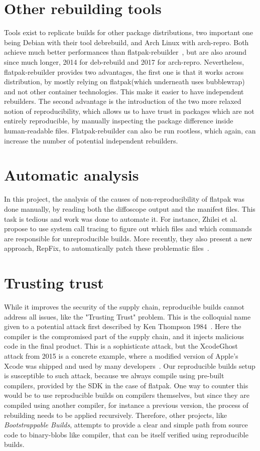 \documentclass[a4paper,11pt,oneside]{report}
\theoremstyle{definition}
\newcommand{\sysname}{flatpak-rebuilder\xspace}
\newcommand{\Sysname}{Flatpak-rebuilder\xspace}
\newcommand{\rb}{reproducible builds\xspace}
\newcommand{\fp}{flatpak\xspace}
\begin{document}
\section{Other rebuilding tools}
Tools exist to replicate builds for other package distributions, two important
one being Debian with their tool debrebuild, and Arch Linux with arch-repro.
Both achieve much better performances than \sysname~\cite{debian:repro,
arch-rebuilderd}, but are also around since much longer, 2014 for deb-rebuild
and 2017 for arch-repro. Nevertheless, \sysname provides two advantages, the
first one is that it works across distribution, by mostly relying on \fp (which
underneath uses bubblewrap) and not other container technologies. This make it
easier to have independent rebuilders. The second advantage is the introduction
of the two more relaxed notion of reproducibility, which allows us to have
trust in packages which are not entirely reproducible, by manually inspecting
the package difference inside human-readable files. \Sysname can also be run
rootless, which again, can increase the number of potential independent
rebuilders.

\section{Automatic analysis}
In this project, the analysis of the causes of non-reproducibility of \fp was
done manually, by reading both the diffoscope output and the manifest files.
This task is tedious and work was done to automate it. For instance, Zhilei et
al.~\cite{DBLP:journals/corr/abs-1803-06766} propose to use system call tracing
to figure out which files and which commands are responsible for unreproducible
builds. More recently, they also present a new approach, RepFix, to
automatically patch these problematic files~\cite{repfix}.

\section{Trusting trust}
While it improves the security of the supply chain, \rb cannot address all
issues, like the "Trusting Trust" problem. This is the colloquial name given to
a potential attack first described by Ken Thompson 1984~\cite{thompson1984}.
Here the compiler is the compromised part of the supply chain, and it injects
malicious code in the final product. This is a sophisticate attack, but the
XcodeGhost attack from 2015 is a concrete example, where a modified version of
Apple's Xcode was shipped and used by many developers~\cite{enwiki:1054394297}.
Our \rb setup is susceptible to such attack, because we always compile using
pre-built compilers, provided by the SDK in the case of \fp. One way to counter
this would be to use \rb on compilers themselves, but since they are compiled
using another compiler, for instance a previous version, the process of
rebuilding needs to be applied recursively. Therefore, other projects, like
\emph{Bootstrappable Builds}, attempts to provide a clear and simple path from
source code to binary-blobs like compiler, that can be itself verified using
\rb.
\end{document}
